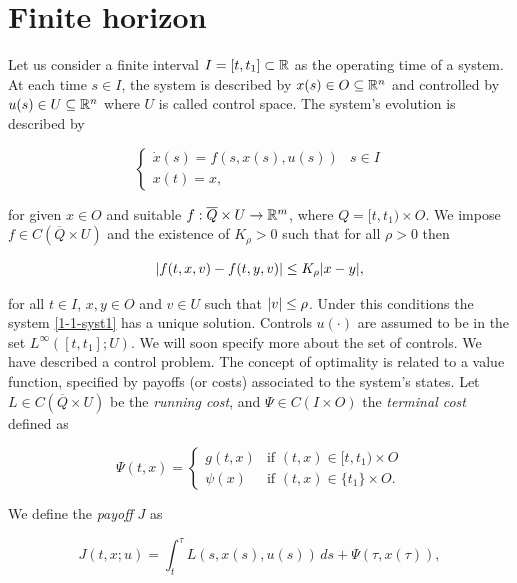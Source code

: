 \section{Finite horizon}


Let us consider a finite interval $I=[t,t_1]\subset\mathbb{R}$ as the operating time of a system. At each time $s\in I$, the system is described by $x(s)\in O\subseteq \mathbb{R}^n$ and controlled by $u(s)\in U\subseteq\mathbb{R}^n$
where $U$ is called control space. The system's evolution is described by

\begin{equation}\label{1-1-syst1}
    \begin{cases}
        \dot{x}(s) = f(s,x(s),u(s)) & s\in I \\
        x(t) = x,
    \end{cases}
\end{equation}

for given $x\in O$ and suitable $f:\overline{Q}\times U \rightarrow \mathbb{R}^m$, where $Q=[t,t_1)\times O$. We impose $f\in C(\overline{Q}\times U)$ and the existence of $K_{\rho}>0$ such that for all $\rho>0$ then

\begin{equation}\label{1-1-lipsch}
    \abs{f(t,x,v)-f(t,y,v)} \leq K_{\rho}\abs{x-y},
\end{equation}

for all $t\in I$, $x,y\in O$ and $v\in U$ such that $\abs{v}\leq\rho$. Under this conditions the system \eqref{1-1-syst1} has a unique solution. 
Controls $u(\cdot)$ are assumed to be in the set $L^{\infty}\left([t,t_1];U\right)$. We will soon specify more about the set of controls.
We have described a control problem. The concept of optimality is related to a value function, specified by payoffs (or costs) associated to the system's states.
Let $L\in C(\overline{Q}\times U)$ be the \textit{running cost}, and $\Psi\in C(I\times O)$ the \textit{terminal cost} defined as

\begin{equation}\label{1-1-deftermcost}
    \Psi(t,x) = \begin{cases}
        g(t,x) & \text{if } (t,x)\in [t,t_1)\times O \\
        \psi(x) & \text{if } (t,x)\in \{t_1\}\times O.  
    \end{cases}
\end{equation}

We define the \textit{payoff} $J$ as

\begin{equation}\label{1-1-payoff1}
    J(t,x;u) = \int_t^{\tau}L(s,x(s),u(s)) \,ds + \Psi(\tau, x(\tau)),
\end{equation}

